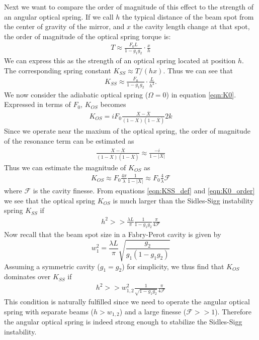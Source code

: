 Next we want to compare the order of magnitude of this effect to the strength of an angular optical spring. If we call $h$ the typical distance of the beam spot from the center of gravity of the mirror, and $x$ the cavity length change at that spot, the order of magnitude of the optical spring torque is:
\begin{eqnarray}
T\approx \frac{F_0 L}{1-g_1g_2}\cdot \frac{x}{h}
\end{eqnarray}
We can express this as the strength of an optical spring located at position $h$. The corresponding spring constant $K_{SS} \approx T/(h x)$. Thus we can see that
\begin{eqnarray}
\label{eqn:KSS_def}
K_{SS} \approx \frac{F_0}{1-g_1g_2}\cdot \frac{L}{h^2}.
\end{eqnarray}
We now consider the adiabatic optical spring ($\Omega=0$) in equation \ref{eqn:K0}.  Expressed in terms of $F_0$, $K_{OS}$ becomes
\begin{eqnarray}
\label{eqn:KOS_exact}
K_{OS}=i F_0 \frac{X-\overline{X}}{(1-X)(1-\overline{X})}   2 k
\end{eqnarray}
Since we operate near the maxium of the optical spring, the order of magnitude of the resonance term can be estimated as
\begin{eqnarray}
\label{eqn:res_est}
\frac{X-\overline{X}}{(1-X)(1-\overline{X})} \approx \frac{-i}{1-|X|}
\end{eqnarray}
Thus we can estimate the magnitude of  $K_{OS}$ as
\begin{eqnarray}
\label{eqn:K0_order}
K_{OS} \approx F_0 \frac{4\pi}{\lambda}\frac{1}{1-|X|} \approx F_0 \frac{4}{\lambda} \mathcal{F}
\end{eqnarray}
where $\mathcal{F}$ is the cavity finesse.
From equations \ref{eqn:KSS_def} and \ref{eqn:K0_order} we see that the optical spring $K_{OS}$  is much larger than the Sidles-Sigg instability spring $K_{SS}$ if
\begin{eqnarray}
\label{eqn:h2}
h^2 >> \frac{\lambda L}{\pi} \frac{1}{1-g_1 g_2} \frac{\pi}{4 \mathcal{F}}
\end{eqnarray}
Now recall that the beam spot size in a Fabry-Perot cavity is given by \cite{Siegman86}
\begin{equation}
w_1^2 = \frac{\lambda L}{\pi} \sqrt{\frac{g_2}{g_1(1-g_1 g_2)}}
\label{equ:spotsize1}
\end{equation} 
Assuming a symmetric cavity ($g_1=g_2$) for simplicity, we thus find that $K_{OS}$  dominates over $K_{SS}$ if
\begin{eqnarray}
\label{eqn:h2w}
h^2 >> w_{1,2}^2 \frac{1}{\sqrt{1-g_1 g_2}} \frac{\pi}{4 \mathcal{F}}
\end{eqnarray}
This condition is naturally fulfilled since we need to operate the angular optical spring with separate beams ($h>w_{1,2}$) and a large finesse ($\mathcal{F}>>1$). Therefore the angular optical spring is indeed strong enough to stabilize the Sidles-Sigg instability.

